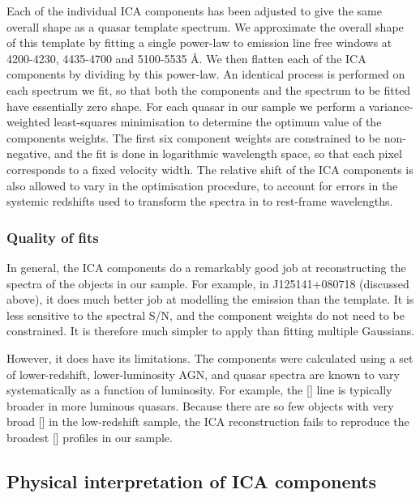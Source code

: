 Each of the individual \ac{ICA} components has been adjusted to give the same overall shape as a quasar template spectrum. 
We approximate the overall shape of this template by fitting a single power-law to emission line free windows at 4200-4230, 4435-4700 and 5100-5535 \AA. 
We then flatten each of the \ac{ICA} components by dividing by this power-law. 
An identical process is performed on each spectrum we fit, so that both the components and the spectrum to be fitted have essentially zero shape. 
For each quasar in our sample we perform a variance-weighted least-squares minimisation to determine the optimum value of the components weights.
The first six component weights are constrained to be non-negative, and the fit is done in logarithmic wavelength space, so that each pixel corresponds to a fixed velocity width.   
The relative shift of the \ac{ICA} components is also allowed to vary in the optimisation procedure, to account for errors in the systemic redshifts used to transform the spectra in to rest-frame wavelengths. 

\subsubsection{Quality of fits}

In general, the \ac{ICA} components do a remarkably good job at reconstructing the spectra of the objects in our sample. 
For example, in J125141+080718 (discussed above), it does much better job at modelling the  emission than the \citet{boroson92} template. 
It is less sensitive to the spectral \ac{S/N}, and the component weights do not need to be constrained. 
It is therefore much simpler to apply than fitting multiple Gaussians. 

However, it does have its limitations. 
The components were calculated using a set of lower-redshift, lower-luminosity \ac{AGN}, and quasar spectra are known to vary systematically as a function of luminosity. 
For example, the [] line is typically broader in more luminous quasars. 
Because there are so few objects with very broad [] in the low-redshift sample, the \ac{ICA} reconstruction fails to reproduce the broadest [] profiles in our sample. 

\subsection{Physical interpretation of \ac{ICA} components}


